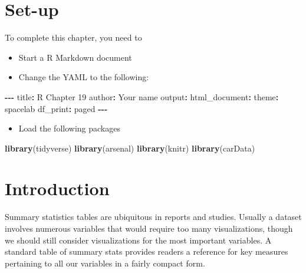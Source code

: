 \documentclass[
]{book}
\makeatletter
\newenvironment{Shaded}{\begin{snugshade}}{\end{snugshade}}
\newcommand{\FunctionTok}[1]{\textcolor[rgb]{0.27,0.27,0.27}{\textbf{#1}}}
\newcommand{\NormalTok}[1]{#1}
\newcommand{\SpecialCharTok}[1]{\textcolor[rgb]{0.43,0.43,0.43}{\textbf{#1}}}
\newcommand{\StringTok}[1]{\textcolor[rgb]{0.5,0.5,0.5}{#1}}
\providecommand{\tightlist}{%
  \setlength{\itemsep}{0pt}\setlength{\parskip}{0pt}}
\newenvironment{kframe}{%
\medskip{}
\setlength{\fboxsep}{.8em}
 \def\at@end@of@kframe{}%
 \ifinner\ifhmode%
  \def\at@end@of@kframe{\end{minipage}}%
  \begin{minipage}{\columnwidth}%
 \fi\fi%
 \def\FrameCommand##1{\hskip\@totalleftmargin \hskip-\fboxsep
 \colorbox{shadecolor}{##1}\hskip-\fboxsep
     \hskip-\linewidth \hskip-\@totalleftmargin \hskip\columnwidth}%
 \MakeFramed {\advance\hsize-\width
   \@totalleftmargin\z@ \linewidth\hsize
   \@setminipage}}%
 {\par\unskip\endMakeFramed%
 \at@end@of@kframe}
\renewenvironment{Shaded}{\begin{kframe}}{\end{kframe}}
\makeatother
\begin{document}
\hypertarget{set-up-2}{%
\section{Set-up}\label{set-up-2}}

To complete this chapter, you need to

\begin{itemize}
\tightlist
\item
  Start a R Markdown document
\item
  Change the YAML to the following:
\end{itemize}

\begin{Shaded}
\begin{Highlighting}[]
\SpecialCharTok{{-}{-}{-}}
\NormalTok{title}\SpecialCharTok{:} \StringTok{\textquotesingle{}R Chapter 19\textquotesingle{}}
\NormalTok{author}\SpecialCharTok{:} \StringTok{\textquotesingle{}Your name\textquotesingle{}}
\NormalTok{output}\SpecialCharTok{:} 
\NormalTok{  html\_document}\SpecialCharTok{:}
\NormalTok{    theme}\SpecialCharTok{:}\NormalTok{ spacelab}
\NormalTok{    df\_print}\SpecialCharTok{:}\NormalTok{ paged}
\SpecialCharTok{{-}{-}{-}}
\end{Highlighting}
\end{Shaded}

\begin{itemize}
\tightlist
\item
  Load the following packages
\end{itemize}

\begin{Shaded}
\begin{Highlighting}[]
\FunctionTok{library}\NormalTok{(tidyverse)}
\FunctionTok{library}\NormalTok{(arsenal)}
\FunctionTok{library}\NormalTok{(knitr)}
\FunctionTok{library}\NormalTok{(carData)}
\end{Highlighting}
\end{Shaded}

\hypertarget{introduction}{%
\section{Introduction}\label{introduction}}

Summary statistics tables are ubiquitous in reports and studies. Usually a dataset involves numerous variables that would require too many visualizations, though we should still consider visualizations for the most important variables. A standard table of summary stats provides readers a reference for key measures pertaining to all our variables in a fairly compact form.
\end{document}
